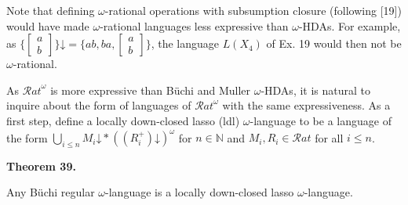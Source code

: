 \documentclass[10pt,a4paper]{article}
\begin{document}
Note that defining $\omega$-rational operations with subsumption closure (following [19]) would have made $\omega$-rational languages less expressive than $\omega$-HDAs. For example, as $\{\left[\begin{smallmatrix}a\\
b\end{smallmatrix}\right]\}\mathord{\downarrow}={\{ab,ba,\left[\begin{smallmatrix}a\\
b\end{smallmatrix}\right]\}}$, the language $L(X_{4})$ of Ex. 19 would then not be $\omega$-rational.\par
 
 
 
As ${\mathcal{R}at}^{\omega}$ is more expressive than Büchi and Muller $\omega$-HDAs, it is natural to inquire about the form of languages of ${\mathcal{R}at}^{\omega}$ with the same expressiveness. As a first step, define a locally down-closed lasso (ldl) $\omega$-language to be a language of the form $\bigcup\nolimits_{i\leqslant n}M_{i}\mathord{\downarrow}*((R_{i}^{+})\mathord{\downarrow})^{\omega}$ for $n\in\mathbb{N}$ and $M_{i},R_{i}\in\mathcal{R}at$ for all $i\leqslant n$.\par
 
 
 
\par\medskip\noindent\textbf{Theorem 39.}\par
 
 
Any Büchi regular $\omega$-language is a locally down-closed lasso $\omega$-language.\par
 
 
 
 
\end{document}
